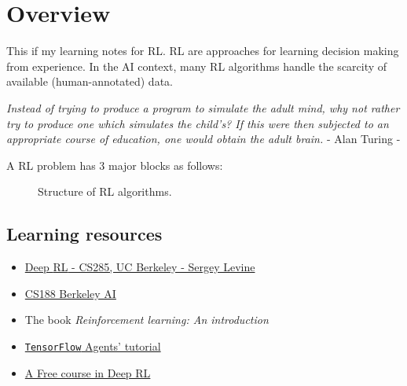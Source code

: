 \chapter{Overview}
This if my learning notes for \ac{RL}. \ac{RL} are approaches for learning decision making from experience. In the \ac{AI} context, many \ac{RL} algorithms handle the scarcity of available (human-annotated) data.

\begin{displayquote}
	\textit{Instead of trying to produce a program to simulate the adult mind, why not rather try to produce one which simulates the child's? If this were then subjected to an appropriate course of education, one would obtain the adult brain.} - Alan Turing -
\end{displayquote}

A \ac{RL} problem has 3 major blocks as follows:
\begin{figure}[hbt!]
	\centering
	\caption{Structure of \ac{RL} algorithms.}
	\label{fig:RL-structure}
\end{figure}

\section{Learning resources}
\begin{itemize}
	\item \href{http://rail.eecs.berkeley.edu/deeprlcourse/}{Deep \ac{RL} - CS285, UC Berkeley - Sergey Levine}
	\item \href{http://ai.berkeley.edu/lecture_videos.fhtml}{CS188 Berkeley AI}
	\item The book \textit{Reinforcement learning: An introduction} \cite{sutton2018reinforcement}
	\item \href{https://www.tensorflow.org/agents/overview}{\texttt{TensorFlow} Agents' tutorial}
	\item \href{https://simoninithomas.github.io/Deep_reinforcement_learning_Course/#}{A Free course in Deep RL}
\end{itemize}


